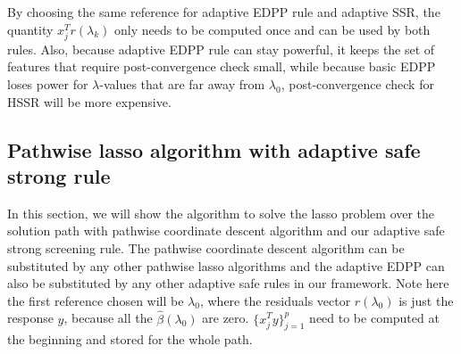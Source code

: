 \documentclass{article}
\begin{document}
By choosing the same reference for adaptive EDPP rule and adaptive SSR, the quantity $x_j^Tr(\lambda_k)$ only needs to be computed once and can be used by both rules. Also, because adaptive EDPP rule can stay powerful, it keeps the set of features that require post-convergence check small, while because basic EDPP loses power for $\lambda$-values that are far away from $\lambda_0$, post-convergence check for HSSR will be more expensive.

\subsection{Pathwise lasso algorithm with adaptive safe strong rule}

In this section, we will show the algorithm to solve the lasso problem over the solution path with pathwise coordinate descent algorithm and our adaptive safe strong screening rule. The pathwise coordinate descent algorithm can be substituted by any other pathwise lasso algorithms and the adaptive EDPP can also be substituted by any other adaptive safe rules in our framework. Note here the first reference chosen will be $\lambda_0$, where the residuals vector $r(\lambda_0)$ is just the response $y$, because all the $\hat{\beta}(\lambda_0)$ are zero. $\{x_j^Ty\}_{j=1}^p$ need to be computed at the beginning and stored for the whole path.
\end{document}
